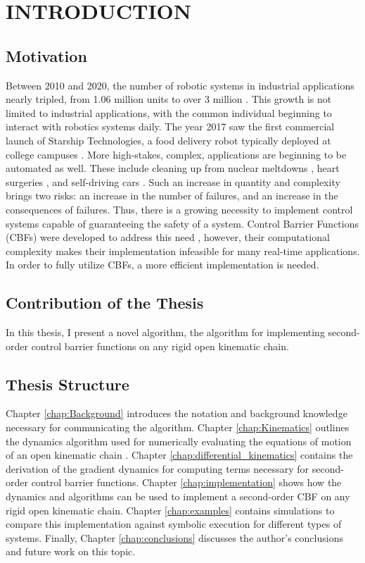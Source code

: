 \chapter{INTRODUCTION}

\section{Motivation}
 
Between 2010 and 2020, the number of robotic systems in industrial applications nearly tripled, from 1.06 million units to over 3 million \Cite{richter_2021}. This growth is not limited to industrial applications, with the common individual beginning to interact with robotics systems daily. The year 2017 saw the first commercial launch of Starship Technologies, a food delivery robot typically deployed at college campuses \Cite{Kottasova}. More high-stakes, complex, applications are beginning to be automated as well. These include cleaning up from nuclear meltdowns \Cite{stahl_2021}, heart surgeries \Cite{mayo_2022}, and self-driving cars \Cite{thrun_2010}. Such an increase in quantity and complexity brings two risks: an increase in the number of failures, and an increase in the consequences of failures. Thus, there is a growing necessity to implement control systems capable of guaranteeing the safety of a system. Control Barrier Functions (CBFs) were developed to address this need \Cite{Ames1}, however, their computational complexity makes their implementation infeasible for many real-time applications. In order to fully utilize CBFs, a more efficient implementation is needed.\newline

\section{Contribution of the Thesis}

 In this thesis, I present a novel algorithm, the \algname{} algorithm for implementing second-order control barrier functions on any rigid open kinematic chain.

 \section{Thesis Structure}
 
 Chapter \ref{chap:Background} introduces the notation and background knowledge necessary for communicating the \algname{} algorithm. Chapter \ref{chap:Kinematics} outlines the dynamics algorithm used for numerically evaluating the equations of motion of an open kinematic chain \Cite{isenberg_2020}.  Chapter \ref{chap:differential_kinematics} contains the derivation of the gradient dynamics for computing terms necessary for second-order control barrier functions. Chapter \ref{chap:implementation} shows how the dynamics and \algname{} algorithms can be used to implement a second-order CBF on any rigid open kinematic chain. Chapter \ref{chap:examples} contains simulations to compare this implementation against symbolic execution for different types of systems. Finally, Chapter  \ref{chap:conclusions} discusses the author's conclusions and future work on this topic.


